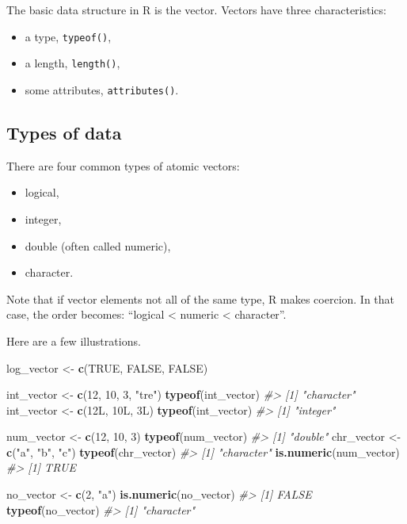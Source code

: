 \documentclass[]{book}
\newenvironment{Shaded}{}{}
\newcommand{\CommentTok}[1]{\textcolor[rgb]{0.38,0.63,0.69}{\textit{#1}}}
\newcommand{\DecValTok}[1]{\textcolor[rgb]{0.25,0.63,0.44}{#1}}
\newcommand{\KeywordTok}[1]{\textcolor[rgb]{0.00,0.44,0.13}{\textbf{#1}}}
\newcommand{\NormalTok}[1]{#1}
\newcommand{\OtherTok}[1]{\textcolor[rgb]{0.00,0.44,0.13}{#1}}
\newcommand{\StringTok}[1]{\textcolor[rgb]{0.25,0.44,0.63}{#1}}
\providecommand{\tightlist}{%
  \setlength{\itemsep}{0pt}\setlength{\parskip}{0pt}}
\theoremstyle{definition}
\theoremstyle{definition}
\theoremstyle{definition}
\theoremstyle{remark}
\begin{document}
The basic data structure in R is the vector. Vectors have three
characteristics:

\begin{itemize}
\tightlist
\item
  a type, \texttt{typeof()},
\item
  a length, \texttt{length()},
\item
  some attributes, \texttt{attributes()}.
\end{itemize}

\hypertarget{types-of-data}{%
\subsection{Types of data}\label{types-of-data}}

There are four common types of atomic vectors:

\begin{itemize}
\tightlist
\item
  logical,
\item
  integer,
\item
  double (often called numeric),
\item
  character.
\end{itemize}

Note that if vector elements not all of the same type, R makes coercion.
In that case, the order becomes: ``logical \textless{} numeric
\textless{} character''.

Here are a few illustrations.

\begin{Shaded}
\begin{Highlighting}[]
\NormalTok{log_vector <-}\StringTok{ }\KeywordTok{c}\NormalTok{(}\OtherTok{TRUE}\NormalTok{, }\OtherTok{FALSE}\NormalTok{, }\OtherTok{FALSE}\NormalTok{)}

\NormalTok{int_vector <-}\StringTok{ }\KeywordTok{c}\NormalTok{(}\DecValTok{12}\NormalTok{, }\DecValTok{10}\NormalTok{, }\DecValTok{3}\NormalTok{, }\StringTok{"tre"}\NormalTok{)}
\KeywordTok{typeof}\NormalTok{(int_vector)}
\CommentTok{#> [1] "character"}
\NormalTok{int_vector <-}\StringTok{ }\KeywordTok{c}\NormalTok{(12L, 10L, 3L)}
\KeywordTok{typeof}\NormalTok{(int_vector)}
\CommentTok{#> [1] "integer"}

\NormalTok{num_vector <-}\StringTok{ }\KeywordTok{c}\NormalTok{(}\DecValTok{12}\NormalTok{, }\DecValTok{10}\NormalTok{, }\DecValTok{3}\NormalTok{)}
\KeywordTok{typeof}\NormalTok{(num_vector)}
\CommentTok{#> [1] "double"}
\NormalTok{chr_vector <-}\StringTok{ }\KeywordTok{c}\NormalTok{(}\StringTok{"a"}\NormalTok{, }\StringTok{"b"}\NormalTok{, }\StringTok{"c"}\NormalTok{)}
\KeywordTok{typeof}\NormalTok{(chr_vector)}
\CommentTok{#> [1] "character"}
\KeywordTok{is.numeric}\NormalTok{(num_vector)}
\CommentTok{#> [1] TRUE}

\NormalTok{no_vector <-}\StringTok{ }\KeywordTok{c}\NormalTok{(}\DecValTok{2}\NormalTok{, }\StringTok{"a"}\NormalTok{)}
\KeywordTok{is.numeric}\NormalTok{(no_vector)}
\CommentTok{#> [1] FALSE}
\KeywordTok{typeof}\NormalTok{(no_vector)}
\CommentTok{#> [1] "character"}
\end{Highlighting}
\end{Shaded}
\end{document}
